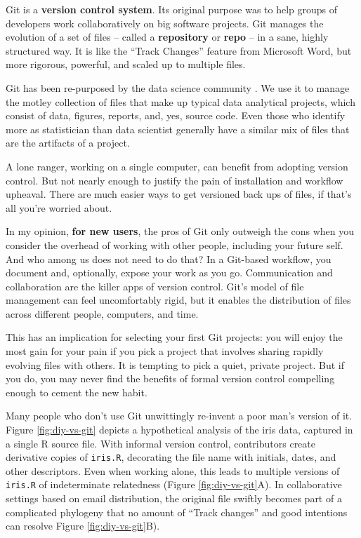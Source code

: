 \documentclass[12pt]{article}
\begin{document}
Git is a \textbf{version control system}. Its original purpose was to
help groups of developers work collaboratively on big software projects.
Git manages the evolution of a set of files -- called a
\textbf{repository} or \textbf{repo} -- in a sane, highly structured
way. It is like the ``Track Changes'' feature from Microsoft Word, but
more rigorous, powerful, and scaled up to multiple files.

Git has been re-purposed by the data science community
\citep{Ram2013, git-for-humans, ten-simple-rules-git}. We use it to
manage the motley collection of files that make up typical data
analytical projects, which consist of data, figures, reports, and, yes,
source code. Even those who identify more as statistician than data
scientist generally have a similar mix of files that are the artifacts
of a project.

A lone ranger, working on a single computer, can benefit from adopting
version control. But not nearly enough to justify the pain of
installation and workflow upheaval. There are much easier ways to get
versioned back ups of files, if that's all you're worried about.

In my opinion, \textbf{for new users}, the pros of Git only outweigh the
cons when you consider the overhead of working with other people,
including your future self. And who among us does not need to do that?
In a Git-based workflow, you document and, optionally, expose your work
as you go. Communication and collaboration are the killer apps of
version control. Git's model of file management can feel uncomfortably
rigid, but it enables the distribution of files across different people,
computers, and time.

This has an implication for selecting your first Git projects: you will
enjoy the most gain for your pain if you pick a project that involves
sharing rapidly evolving files with others. It is tempting to pick a
quiet, private project. But if you do, you may never find the benefits
of formal version control compelling enough to cement the new habit.

Many people who don't use Git unwittingly re-invent a poor man's version
of it. Figure \ref{fig:diy-vs-git} depicts a hypothetical analysis of
the iris data, captured in a single R source file. With informal version
control, contributors create derivative copies of \texttt{iris.R},
decorating the file name with initials, dates, and other descriptors.
Even when working alone, this leads to multiple versions of
\texttt{iris.R} of indeterminate relatedness (Figure
\ref{fig:diy-vs-git}A). In collaborative settings based on email
distribution, the original file swiftly becomes part of a complicated
phylogeny that no amount of ``Track changes'' and good intentions can
resolve Figure \ref{fig:diy-vs-git}B).
\end{document}
